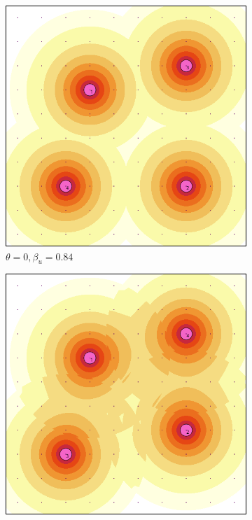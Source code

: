 \documentclass[letterpaper, 10 pt, conference]{ieeeconf}
\begin{document}
\begin{figure}[!t]
    \centering
    \begin{subfigure}[t]{0.32\columnwidth}
        \centering
        \includegraphics[width=0.9\columnwidth]{Figures/DetFun_0.png}
        \caption{$\theta = 0, \beta_u=0.84$}
    \end{subfigure}%
    \hfill
    \begin{subfigure}[t]{0.32\columnwidth}
        \centering
        \includegraphics[width=0.9\columnwidth]{Figures/DetFun_50.png}

\end{subfigure}
\end{figure}
\end{document}
